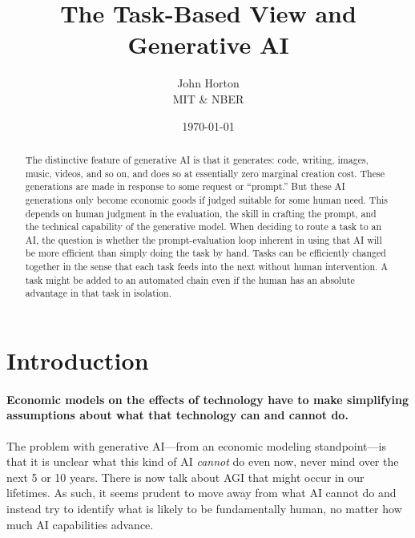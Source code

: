 \documentclass{article}
\begin{document}
\title{The Task-Based View and Generative AI}
\author{John Horton\\MIT \& NBER}
\date{\today{}}

\newcommand{\machine}[1]{\langle #1 \rangle}
\newcommand{\human}[1]{( #1 )}
\newcommand{\cost}[1]{C\{ #1 \}}
\newcommand{\costdo}[1]{C_H\{ #1 \}}
\newcommand{\costmanage}[1]{C_M\{ #1 \}}

\newcommand{\topic}[1]{\paragraph{#1}}

\maketitle

\begin{abstract}
\noindent The distinctive feature of generative AI is that it generates: code, writing, images, music, videos, and so on, and does so at essentially zero marginal creation cost.
These generations are made in response to some request or ``prompt.''
But these AI generations only become economic goods if judged suitable for some human need.
This depends on human judgment in the evaluation, the skill in crafting the prompt, and the technical capability of the generative model. 
When deciding to route a task to an  AI, the question is whether the prompt-evaluation loop inherent in using that AI will be more efficient than simply doing the task by hand. 
Tasks can be efficiently changed together in the sense that each task feeds into the next without human intervention.
A task might be added to an automated chain even if the human has an absolute advantage in that task in isolation.
\end{abstract}

\onehalfspacing

\section{Introduction}
\topic{Economic models on the effects of technology have to make simplifying assumptions about what that technology can and cannot do.}
The problem with generative AI---from an economic modeling standpoint---is that it is unclear what this kind of AI \emph{cannot} do even now, never mind over the next 5 or 10 years.
There is now talk about AGI that might occur in our lifetimes.
As such, it seems prudent to move away from what AI cannot do and instead try to identify what is likely to be fundamentally human, no matter how much AI capabilities advance.
\end{document}
